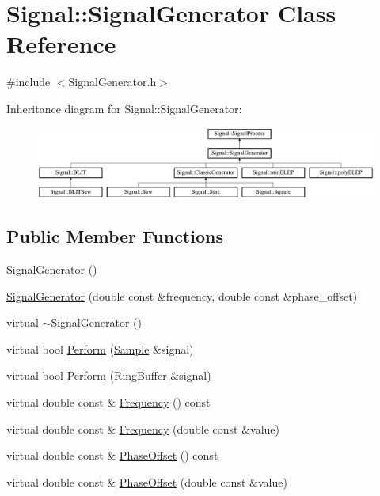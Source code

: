 \hypertarget{class_signal_1_1_signal_generator}{\section{Signal\+:\+:Signal\+Generator Class Reference}
\label{class_signal_1_1_signal_generator}
}


{\ttfamily \#include $<$Signal\+Generator.\+h$>$}

Inheritance diagram for Signal\+:\+:Signal\+Generator\+:\begin{figure}[H]
\begin{center}
\leavevmode
\includegraphics[height=2.348008cm]{class_signal_1_1_signal_generator}
\end{center}
\end{figure}
\subsection*{Public Member Functions}
\begin{DoxyCompactItemize}
\item 
\hyperlink{class_signal_1_1_signal_generator_a8c67c754d86e0363445d7fd271855e1a}{Signal\+Generator} ()
\item 
\hyperlink{class_signal_1_1_signal_generator_a0a09e58b391b2e65af370bbf266b888c}{Signal\+Generator} (double const \&frequency, double const \&phase\+\_\+offset)
\item 
virtual \hyperlink{class_signal_1_1_signal_generator_a2c0cb5fa941326bc206f45a07aa872ef}{$\sim$\+Signal\+Generator} ()
\item 
virtual bool \hyperlink{class_signal_1_1_signal_generator_a2cd9061c5ae40a392a9476551b4379f3}{Perform} (\hyperlink{class_signal_1_1_sample}{Sample} \&signal)
\item 
virtual bool \hyperlink{class_signal_1_1_signal_generator_a126d52dd9b6b14d33efc624e2c89284e}{Perform} (\hyperlink{class_signal_1_1_ring_buffer}{Ring\+Buffer} \&signal)
\item 
virtual double const \& \hyperlink{class_signal_1_1_signal_generator_a96af42ee68f94e9b04d034fd68b73ecd}{Frequency} () const 
\item 
virtual double const \& \hyperlink{class_signal_1_1_signal_generator_af83b532bf3ddc3637c2fd7a1dfd095cb}{Frequency} (double const \&value)
\item 
virtual double const \& \hyperlink{class_signal_1_1_signal_generator_ac2538ec946f001e394d2416fda698d1c}{Phase\+Offset} () const 
\item 
virtual double const \& \hyperlink{class_signal_1_1_signal_generator_ac6a103ff72beaa338f6d18c812522d78}{Phase\+Offset} (double const \&value)
\end{DoxyCompactItemize}
